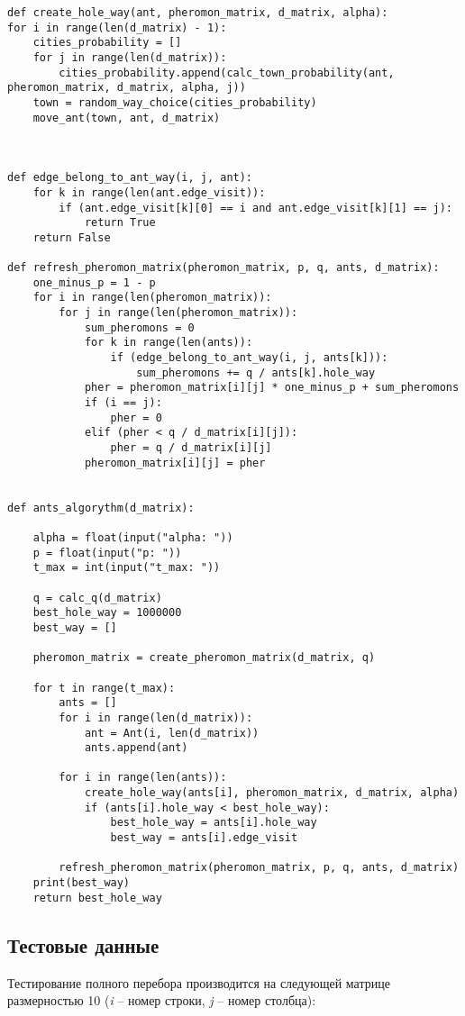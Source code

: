 \documentclass[a4paper,12pt]{article}
\begin{document}
\begin{lstlisting}[label=lst2,caption=Реализация муравьиного алгоритма для решения задачи коммивояжера]
def create_hole_way(ant, pheromon_matrix, d_matrix, alpha):
for i in range(len(d_matrix) - 1):
	cities_probability = []
	for j in range(len(d_matrix)):
		cities_probability.append(calc_town_probability(ant, pheromon_matrix, d_matrix, alpha, j))
	town = random_way_choice(cities_probability)
	move_ant(town, ant, d_matrix)



def edge_belong_to_ant_way(i, j, ant):
	for k in range(len(ant.edge_visit)):
		if (ant.edge_visit[k][0] == i and ant.edge_visit[k][1] == j):
			return True
	return False

def refresh_pheromon_matrix(pheromon_matrix, p, q, ants, d_matrix):
	one_minus_p = 1 - p
	for i in range(len(pheromon_matrix)):
		for j in range(len(pheromon_matrix)):
			sum_pheromons = 0
			for k in range(len(ants)):
				if (edge_belong_to_ant_way(i, j, ants[k])):
					sum_pheromons += q / ants[k].hole_way
			pher = pheromon_matrix[i][j] * one_minus_p + sum_pheromons
			if (i == j):
				pher = 0
			elif (pher < q / d_matrix[i][j]):
				pher = q / d_matrix[i][j]
			pheromon_matrix[i][j] = pher


def ants_algorythm(d_matrix):

	alpha = float(input("alpha: "))
	p = float(input("p: "))
	t_max = int(input("t_max: "))
	
	q = calc_q(d_matrix)
	best_hole_way = 1000000
	best_way = []
	
	pheromon_matrix = create_pheromon_matrix(d_matrix, q)
	
	for t in range(t_max):
		ants = []
		for i in range(len(d_matrix)):
			ant = Ant(i, len(d_matrix))
			ants.append(ant)
	
		for i in range(len(ants)):
			create_hole_way(ants[i], pheromon_matrix, d_matrix, alpha)
			if (ants[i].hole_way < best_hole_way):
				best_hole_way = ants[i].hole_way
				best_way = ants[i].edge_visit
	
		refresh_pheromon_matrix(pheromon_matrix, p, q, ants, d_matrix)
	print(best_way)
	return best_hole_way
\end{lstlisting}


\subsection{Тестовые данные}
\label{fig:test_data}

Тестирование полного перебора производится на следующей матрице
размерностью 10 (\textit{i} -- номер строки,
\textit{j} -- номер столбца):
\end{document}
